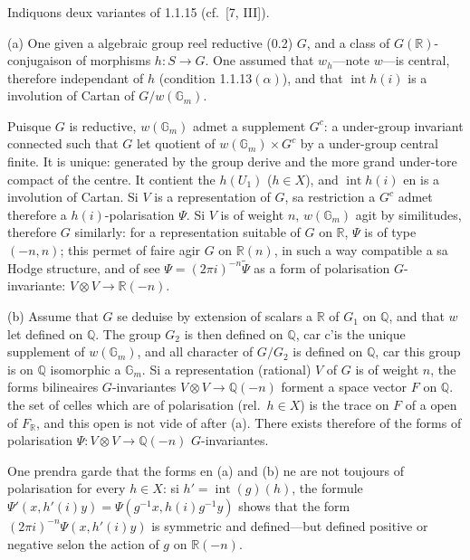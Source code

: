 \documentclass[12pt,a4paper]{article}
\theoremstyle{plain}
\theoremstyle{definition}
\theoremstyle{remark}
\DeclareMathOperator{\Int}{int}
\newcommand{\QQ}{\mathbb{Q}}
\newcommand{\RR}{\mathbb{R}}
\newcommand{\Gm}{\mathbb{G}}
\begin{document}
\subsubsection{}

Indiquons deux variantes of 1.1.15 (cf.~[7, III]).

(a) One given a algebraic group reel reductive (0.2) $G$, and a class of $G(\RR)$-conjugaison of morphisms $h:S \to G$. One assumed that $w_h$---note $w$---is central, therefore independant of $h$ (condition 1.1.13$(\alpha)$), and that $\Int h(i)$ is a involution of Cartan of $G/w(\Gm_m)$.

Puisque $G$ is reductive, $w(\Gm_m)$ admet a supplement $G^c$: a under-group invariant connected such that $G$ let quotient of $w(\Gm_m) \times G^c$ by a under-group central finite. It is unique: generated by the group derive and the more grand under-tore compact of the centre. It contient the $h(U_1)$ ($h \in X$), and $\Int h(i)$ en is a involution of Cartan. Si $V$ is a representation of $G$, sa restriction a $G^c$ admet therefore a $h(i)$-polarisation $\Psi$. Si $V$ is of weight $n$, $w(\Gm_m)$ agit by similitudes, therefore $G$ similarly: for a representation suitable of $G$ on $\RR$, $\Psi$ is of type $(-n,n)$; this permet of faire agir $G$ on $\RR(n)$, in such a way compatible a sa Hodge structure, and of see $\Psi = (2\pi i)^{-n}\tilde{\Psi}$ as a form of polarisation $G$-invariante: $V \otimes V \to \RR(-n)$.

(b) Assume that $G$ se deduise by extension of scalars a $\RR$ of $G_1$ on $\QQ$, and that $w$ let defined on $\QQ$. The group $G_2$ is then defined on $\QQ$, car c'is the unique supplement of $w(\Gm_m)$, and all character of $G/G_2$ is defined on $\QQ$, car this group is on $\QQ$ isomorphic a $\Gm_m$. Si a representation (rational) $V$ of $G$ is of weight $n$, the forms bilineaires $G$-invariantes $V \otimes V \to \QQ(-n)$ forment a space vector $F$ on $\QQ$. the set of celles which are of polarisation (rel.~$h \in X$) is the trace on $F$ of a open of $F_{\RR}$, and this open is not vide of after (a). There exists therefore of the forms of polarisation $\Psi:V \otimes V \to \QQ(-n)$ $G$-invariantes.

One prendra garde that the forms en (a) and (b) ne are not toujours of polarisation for every $h \in X$: si $h' = \Int(g)(h)$, the formule $\Psi'(x,h'(i)y) = \Psi(g^{-1}x,h(i)g^{-1}y)$ shows that the form $(2\pi i)^{-n}\Psi(x,h'(i)y)$ is symmetric and defined---but defined positive or negative selon the action of $g$ on $\RR(-n)$.
\end{document}
